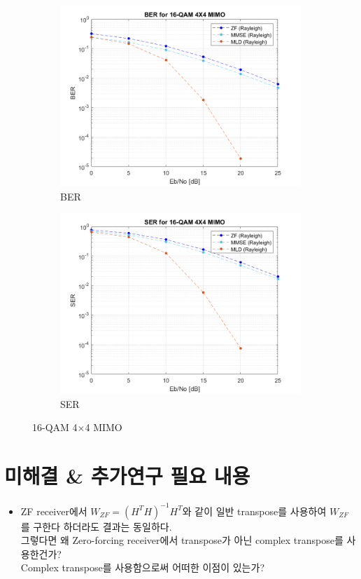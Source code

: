 \documentclass{article}
\begin{document}
\begin{figure}[H]
\begin{subfigure}{0.5\textwidth}
		\centerline{\includegraphics[width=1\textwidth]{d_Eb_BER.png}}
		\caption{BER}
	\end{subfigure}%
	\begin{subfigure}{0.5\textwidth}
		\centerline{\includegraphics[width=1\textwidth]{d_Eb_SER.png}}
		\caption{SER}
	\end{subfigure}%
	\caption{16-QAM 4$\times$4 MIMO}
\end{figure}
\section{미해결 \& 추가연구 필요 내용}
\begin{itemize}
  \item ZF receiver에서 $W_{ZF}=(H^T H)^{-1}H^T$와 같이 일반 transpose를 사용하여 $W_{ZF}$를 구한다 하더라도 결과는 동일하다.\\그렇다면 왜 Zero-forcing receiver에서 transpose가 아닌 complex transpose를 사용한건가?\\Complex transpose를 사용함으로써 어떠한 이점이 있는가?
\end{itemize}
\end{document}
